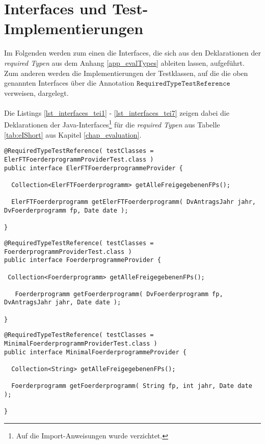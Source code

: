 \chapter{Interfaces und Test-Implementierungen}\label{app_interfacesAndTests}
Im Folgenden werden zum einen die Interfaces, die sich aus den Deklarationen der \emph{required Typen} aus dem Anhang \ref{app_evalTypes} ableiten lassen, aufgeführt. Zum anderen werden die Implementierungen der Testklassen, auf die die oben genannten Interfaces über die Annotation $\texttt{RequiredTypeTestReference}$ verweisen, dargelegt. 
\\\\
Die Listings \ref{lst_interfaces_tei1} - \ref{lst_interfaces_tei7} zeigen dabei die Deklarationen der Java-Interfaces\footnote{Auf die Import-Anweisungen wurde verzichtet.} für die \emph{required Typen} aus Tabelle \ref{tab:eIShort} aus Kapitel \ref{chap_evaluation}.
\begin{lstlisting}[style = java, caption = Interface ElerFTFoerderprogrammeProvider, captionpos = b, label = lst_interfaces_tei1]
@RequiredTypeTestReference( testClasses = ElerFTFoerderprogrammProviderTest.class )
public interface ElerFTFoerderprogrammeProvider {

  Collection<ElerFTFoerderprogramm> getAlleFreigegebenenFPs();

  ElerFTFoerderprogramm getElerFTFoerderprogramm( DvAntragsJahr jahr, DvFoerderprogramm fp, Date date );
  
}
\end{lstlisting}
\begin{lstlisting}[style = java, caption = Interface FoerderprogrammeProvider, captionpos = b, label = lst_interfaces_tei2]
@RequiredTypeTestReference( testClasses = FoerderprogrammProviderTest.class )
public interface FoerderprogrammeProvider {

 Collection<Foerderprogramm> getAlleFreigegebenenFPs();

   Foerderprogramm getFoerderprogramm( DvFoerderprogramm fp, DvAntragsJahr jahr, Date date );
   
}
\end{lstlisting}
\begin{lstlisting}[style = java, caption = Interface MinimalFoerderprogrammeProvider, captionpos = b, label = lst_interfaces_tei3]
@RequiredTypeTestReference( testClasses = MinimalFoerderprogrammProviderTest.class )
public interface MinimalFoerderprogrammeProvider {

  Collection<String> getAlleFreigegebenenFPs();

  Foerderprogramm getFoerderprogramm( String fp, int jahr, Date date );
  
}
\end{lstlisting}
